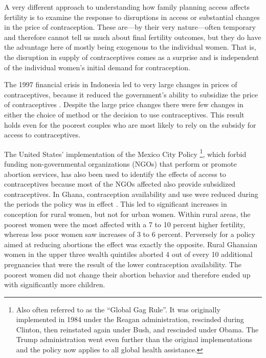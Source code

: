 \documentclass[letterpaper,12pt]{article}
\begin{document}
A very different approach to understanding how family planning access
affects fertility is to examine the response to disruptions in access or
substantial changes in the price of contraception. 
These are---by their very nature---often temporary and therefore cannot
tell us much about final fertility outcomes, but they do have the
advantage here of mostly being exogenous to the individual women. 
That is, the disruption in supply of contraceptives comes as a surprise
and is independent of the individual women's initial demand for
contraception.

The 1997 financial crisis in Indonesia led to very large changes in
prices of contraceptives, because it reduced the government's ability to
subsidize the price of contraceptives \citep{McKelvey2012}. 
Despite the large price changes there were few changes in either the
choice of method or the decision to use contraceptives. 
This result holds even for the poorest couples who are most likely to
rely on the subsidy for access to contraceptives.

The United States' implementation of the Mexico City Policy%
\footnote{
Also often referred to as the ``Global Gag Rule''. 
It was originally implemented in 1984 under the Reagan administration, 
rescinded during Clinton, then reinstated again under Bush, and 
rescinded under Obama.
The Trump administration went even further than the original 
implementations and the policy now applies to all global health
assistance.
}, which forbid funding non-governmental organizations (NGOs) that perform
or promote abortion services, has also been used to identify the effects
of access to contraceptives because most of the NGOs affected also
provide subsidized contraceptives. 
In Ghana, contraception availability and use were reduced during the
periods the policy was in effect \citep{Jones2015}. 
This led to significant increases in conception for rural women, but not
for urban women. 
Within rural areas, the poorest women were the most affected with a 7 to
10 percent higher fertility, whereas less poor women saw increases of 3
to 6 percent. 
Perversely for a policy aimed at reducing abortions the effect was
exactly the opposite. 
Rural Ghanaian women in the upper three wealth quintiles aborted 4 out
of every 10 additional pregnancies that were the result of the lower
contraception availability. 
The poorest women did not change their abortion behavior and therefore
ended up with significantly more children.
\end{document}
